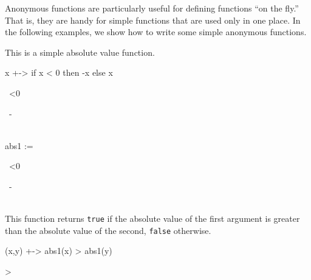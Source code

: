
Anonymous functions are particularly useful for defining functions
``on the fly.'' That is, they are handy for simple functions that
are used only in one place.
In the following examples, we show how to write some simple
anonymous functions.

\begin{xtc}
\begin{xtccomment}
This is a simple absolute value function.
\end{xtccomment}
\begin{spadsrc}
x +-> if x < 0 then -x else x 
\end{spadsrc}
\begin{TeXOutput}
\begin{fricasmath}{1}
\mapsto {}\ <0\ \begin{PILE}\ -{%
}\\\ \end{PILE}%
\end{fricasmath}
\end{TeXOutput}
\end{xtc}
\begin{xtc}
\begin{xtccomment}
\end{xtccomment}
\begin{spadsrc}
abs1 := %
\end{spadsrc}
\begin{TeXOutput}
\begin{fricasmath}{2}
\mapsto {}\ <0\ \begin{PILE}\ -{%
}\\\ \end{PILE}%
\end{fricasmath}
\end{TeXOutput}
\end{xtc}
\begin{xtc}
\begin{xtccomment}
This function returns {\tt true} if the absolute value of
the first argument is greater than the absolute value of the
second, {\tt false} otherwise.
\end{xtccomment}
\begin{spadsrc}
(x,y) +-> abs1(x) > abs1(y) 
\end{spadsrc}
\begin{TeXOutput}
\begin{fricasmath}{3}
\mapsto {}>%
\end{fricasmath}
\end{TeXOutput}
\end{xtc}
